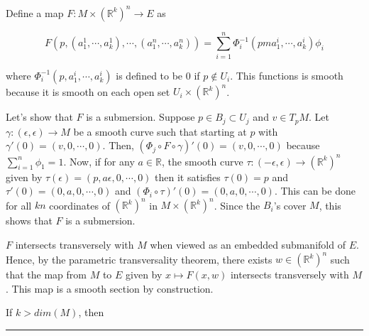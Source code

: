 \documentclass{article}
\newcommand{\R}{\mathbb{R}}
\begin{document}
Define a map $F : M \times \left(\R^k\right)^n \rightarrow E$ as 

\[  F\left(p, (a_1^1, \cdots, a_k^1), \cdots, (a_1^n, \cdots, a_k^n)\right) = \sum_{i = 1}^{n} \Phi_i^{-1} (pm a_1^i, \cdots, a_k^i) \phi_i  \]

where $\Phi_i^{-1}(p, a_1^i, \cdots, a_k^i)$ is defined to be 0 if $p \not\in U_i$. This functions is smooth because it is smooth on each open set $U_i \times \left(\R^k\right)^n$.


Let's show that $F$ is a submersion. Suppose $p \in B_j \subset U_j$ and $v \in T_pM$. Let $\gamma : (\epsilon, \epsilon) \rightarrow M$ be a smooth curve such that starting at $p$ with $\gamma'(0) = (v, 0, \cdots, 0)$. Then, $\left(\Phi_j \circ F \circ \gamma\right)'(0) = (v, 0, \cdots, 0)$ because $\sum_{i = 1}^{n} \phi_1 = 1$. Now, if for any $a \in \R$, the smooth curve $\tau : (-\epsilon, \epsilon) \rightarrow \left(\R^k\right)^n$ given by $\tau(\epsilon) = (p, a\epsilon, 0, \cdots, 0)$ then it satisfies $\tau(0) = p$ and $\tau'(0) = (0, a, 0, \cdots, 0)$ and $\left(\Phi_i \circ \tau\right)'(0) = (0, a, 0, \cdots, 0)$. This can be done for all $kn$ coordinates of $(\R^k)^n$ in $M \times (\R^k)^n$. Since the $B_i$'s cover $M$, this shows that $F$ is a submersion.


$F$ intersects transversely with $M$ when viewed as an embedded submanifold of $E$. Hence, by the parametric transversality theorem, there exists $w \in (\R^k)^n$ such that the map from $M$ to $E$ given by $x \mapsto F(x, w)$ intersects transversely with $M$. This map is a smooth section by construction.


If $k > dim(M)$, then 

\vskip 0.5cm
\hrule 
\vskip 0.5cm







\end{document}
